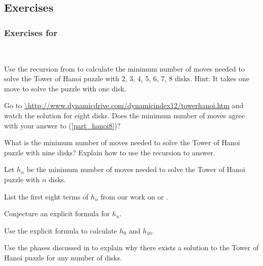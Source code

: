 
\subsection{Exercises}


\subsubsection*{Exercises for 
 \subhanoi}

\begin{exer}[\exerP] %
\label{exer_hanoi89}
~
    \begin{exerpart}
        \item \label{part_hanoi8} Use the recursion from  to calculate the minimum number of moves needed to solve the Tower of Hanoi puzzle with 2, 3, 4, 5, 6, 7, 8 disks.  Hint: It takes one move to solve the puzzle with one disk.
        \item Go to \url{\http://www.dynamicdrive.com/dynamicindex12/towerhanoi.htm} and watch the solution for eight disks.  Does the minimum number of moves agree with your answer to (\ref{part_hanoi8})?
        \item What is the minimum number of moves needed to solve the Tower of Hanoi puzzle with nine disks?  Explain how to use the recursion to answer.
    \end{exerpart}
\end{exer}

\begin{exer}[\exerU] %
\label{exer_hanoi_explicit}
    Let $h_n$ be the minimum number of moves needed to solve the Tower of Hanoi puzzle with $n$ disks.
    \begin{exerpart}
        \item List the first eight terms of $h_n$ from our work on  or .
        \item Conjecture an explicit formula for $h_n$.  
        \item Use the explicit formula to calculate $h_9$ and $h_{10}$.
    \end{exerpart}
\end{exer}

\begin{exer}[\exerU] %
\label{exer_hanoi_exist_soln}
   Use the phases discussed in  to explain why there exists a solution to the Tower of Hanoi puzzle for any number of disks.
\end{exer}

